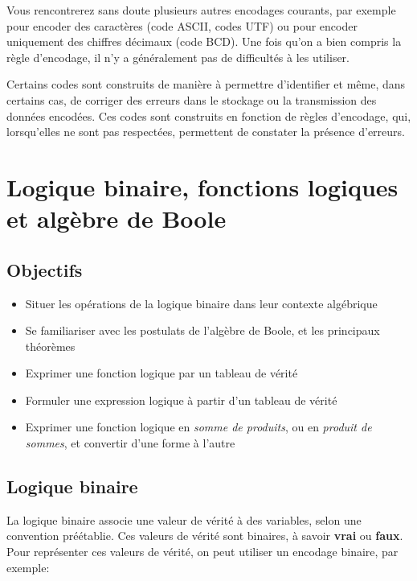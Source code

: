 \documentclass[letter, oneside]{book}
\begin{document}
\begin{enumerate}
Vous rencontrerez sans doute plusieurs autres encodages courants,
par exemple pour encoder des caractères (code ASCII, codes UTF)
ou pour encoder uniquement des chiffres décimaux (code BCD). Une fois
qu'on a bien compris la règle d'encodage, il n'y a généralement pas de
difficultés à les utiliser.

Certains codes sont construits de manière à permettre d'identifier et
même, dans certains cas, de corriger des erreurs dans le stockage ou
la transmission des données encodées. Ces codes sont construits en
fonction de règles d'encodage, qui, lorsqu'elles ne sont pas
respectées, permettent de constater la présence d'erreurs.
\end{enumerate}

\chapter{Logique binaire, fonctions logiques et algèbre de Boole}
\label{sec:org9785f79}


\section{Objectifs}
\label{sec:orgdc5b57f}
\begin{itemize}
\item Situer les opérations de la logique binaire dans leur contexte algébrique
\item Se familiariser avec les postulats de l'algèbre de Boole, et les
principaux théorèmes
\item Exprimer une fonction logique par un tableau de vérité
\item Formuler une expression logique à partir d'un tableau de vérité
\item Exprimer une fonction logique en \emph{somme de produits}, ou en
\emph{produit de sommes}, et convertir d'une forme à l'autre
\end{itemize}

\section{Logique binaire}
\label{sec:orgc2cb567}

La logique binaire associe une valeur de vérité à des variables, selon
une convention préétablie. Ces valeurs de vérité sont binaires, à
savoir \textbf{vrai} ou \textbf{faux}. Pour représenter ces valeurs de vérité, on
peut utiliser un encodage binaire, par exemple:
\end{document}
